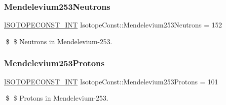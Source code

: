 \subsubsection{\texorpdfstring{Mendelevium253\+Neutrons}{Mendelevium253Neutrons}}
{\footnotesize\ttfamily \mbox{\hyperlink{group___isotope_const-_macros_ga5f18360b3e99483a35c32d789e62621c}{I\+S\+O\+T\+O\+P\+E\+C\+O\+N\+S\+T\+\_\+\+I\+NT}} Isotope\+Const\+::\+Mendelevium253\+Neutrons = 152}

\$ \$ Neutrons in Mendelevium-\/253. \mbox{\label{group___isotope_const-_mendelevium-_md253_ga0c4790cf1b040fbe8734a6c42f1949a9}} 
\subsubsection{\texorpdfstring{Mendelevium253\+Protons}{Mendelevium253Protons}}
{\footnotesize\ttfamily \mbox{\hyperlink{group___isotope_const-_macros_ga5f18360b3e99483a35c32d789e62621c}{I\+S\+O\+T\+O\+P\+E\+C\+O\+N\+S\+T\+\_\+\+I\+NT}} Isotope\+Const\+::\+Mendelevium253\+Protons = 101}

\$ \$ Protons in Mendelevium-\/253. 